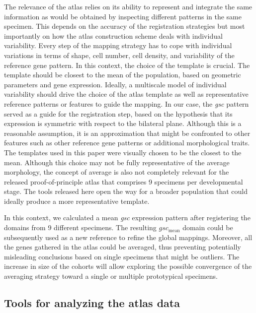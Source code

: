 The relevance of the atlas relies on its ability to represent and integrate the same information as would be obtained by inspecting different patterns in the same specimen. This depends on the accuracy of the registration strategies but most importantly on how the atlas construction scheme deals with individual variability. Every step of the mapping strategy has to cope with individual variations in terms of shape, cell number, cell density, and variability of the reference gene pattern. In this context, the choice of the template is crucial. The template should be closest to the mean of the population, based on geometric parameters and gene expression. Ideally, a multiscale model of individual variability should drive the choice of the atlas template as well as representative reference patterns or features to guide the mapping. In our case, the \emph{gsc} pattern served as a guide for the registration step, based on the hypothesis that its expression is symmetric with respect to the bilateral plane. Although this is a reasonable assumption, it is an approximation that might be confronted to other features such as other reference gene patterns or additional morphological traits. The templates used in this paper were visually chosen to be the closest to the mean. Although this choice may not be fully representative of the average morphology, the concept of average is also not completely relevant for the released proof-of-principle atlas that comprises 9 specimens per developmental stage. The tools released here open the way for a broader population that could ideally produce a more representative template.



In this context, we calculated a mean \emph{gsc} expression pattern after registering the domains from 9 different specimens. The resulting $gsc_\mathrm{mean}$ domain could be subsequently used as a new reference to refine the global mappings. Moreover, all the genes gathered in the atlas could be averaged, thus preventing potentially misleading conclusions based on single specimens that might be outliers. The increase in size of the cohorts will allow exploring the possible convergence of the averaging strategy toward a single or multiple prototypical specimens.



\subsection*{Tools for analyzing the atlas data}



